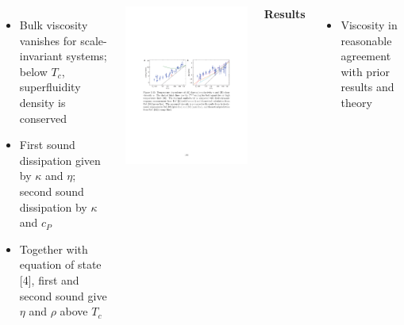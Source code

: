 \documentclass[26pt, paperwidth=36in,paperheight=48in]{tikzposter} %
\newcommand{\myfont}{\fontsize{24}{30}\selectfont}
\begin{document}
\begin{columns}
{\begin{minipage}{0.38\textwidth}
\begin{itemize}
				\item Bulk viscosity vanishes for scale-invariant systems; below $T_c$, superfluidity density is conserved 
				
				\item First sound dissipation given by $\kappa$ and $\eta$; second sound dissipation by $\kappa$ and $c_P$
				
				\item Together with equation of state [4], first and second sound give $\eta$ and $\rho$ above $T_c$
			\end{itemize}
		\end{minipage}

		\begin{minipage}{0.48\textwidth}
			\centering
			\includegraphics[width=\textwidth,
			trim=3.4cm 13cm 0cm 8.5cm,clip]{figures/transport.pdf}
		\end{minipage}
	
	
	
	\vspace{-1cm}
	\begin{minipage}{0.16\textwidth}
		\flushleft
		\textbf{Results}
		\vspace{0.2cm}
		\myfont
		\begin{itemize}
			\item Viscosity in reasonable agreement with prior results and theory
			

\end{itemize}
\end{minipage}}
\end{columns}
\end{document}
